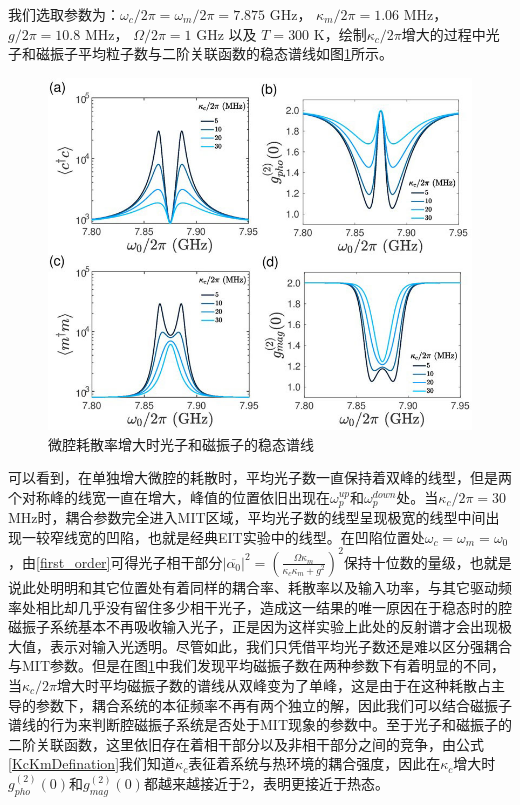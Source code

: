 我们选取参数为：$\omega_c/2\pi=\omega_m/2\pi=7.875$ GHz， $\kappa_m/2\pi=1.06$ MHz， $g/2\pi=10.8$ MHz， $\Omega/2\pi=1$ GHz 以及 $T=300$ K，绘制$\kappa_c/2\pi$增大的过程中光子和磁振子平均粒子数与二阶关联函数的稳态谱线如图\ref{MITkcVary}所示。
\begin{figure}[htbp]
	\centering
	\includegraphics[width=2\basefigurewidth,clip]{./figure/4_5}
	\caption{微腔耗散率增大时光子和磁振子的稳态谱线} 
	\label{MITkcVary}
\end{figure}
可以看到，在单独增大微腔的耗散时，平均光子数一直保持着双峰的线型，但是两个对称峰的线宽一直在增大，峰值的位置依旧出现在$\omega_p^{up}$和$\omega_p^{down}$处。当$\kappa_c/2\pi=30$MHz时，耦合参数完全进入MIT区域，平均光子数的线型呈现极宽的线型中间出现一较窄线宽的凹陷，也就是经典EIT实验中的线型。在凹陷位置处$\omega_c=\omega_m=\omega_0$，由\eqref{first_order}可得光子相干部分$|\overline{\alpha_{0}}|^2 = \left(\frac{\Omega\kappa_{m}}{\kappa_{c}\kappa_{m}+g^{2}}\right)^2$保持十位数的量级，也就是说此处明明和其它位置处有着同样的耦合率、耗散率以及输入功率，与其它驱动频率处相比却几乎没有留住多少相干光子，造成这一结果的唯一原因在于稳态时的腔磁振子系统基本不再吸收输入光子，正是因为这样实验上此处的反射谱才会出现极大值，表示对输入光透明。尽管如此，我们只凭借平均光子数还是难以区分强耦合与MIT参数。但是在图\ref{MITkcVary}中我们发现平均磁振子数在两种参数下有着明显的不同，当$\kappa_c/2\pi$增大时平均磁振子数的谱线从双峰变为了单峰，这是由于在这种耗散占主导的参数下，耦合系统的本征频率不再有两个独立的解，因此我们可以结合磁振子谱线的行为来判断腔磁振子系统是否处于MIT现象的参数中。至于光子和磁振子的二阶关联函数，这里依旧存在着相干部分以及非相干部分之间的竞争，由公式\eqref{KcKmDefination}我们知道$\kappa_c$表征着系统与热环境的耦合强度，因此在$\kappa_c$增大时$g_{pho}^{(2)}(0)$和$g_{mag}^{(2)}(0)$都越来越接近于2，表明更接近于热态。

